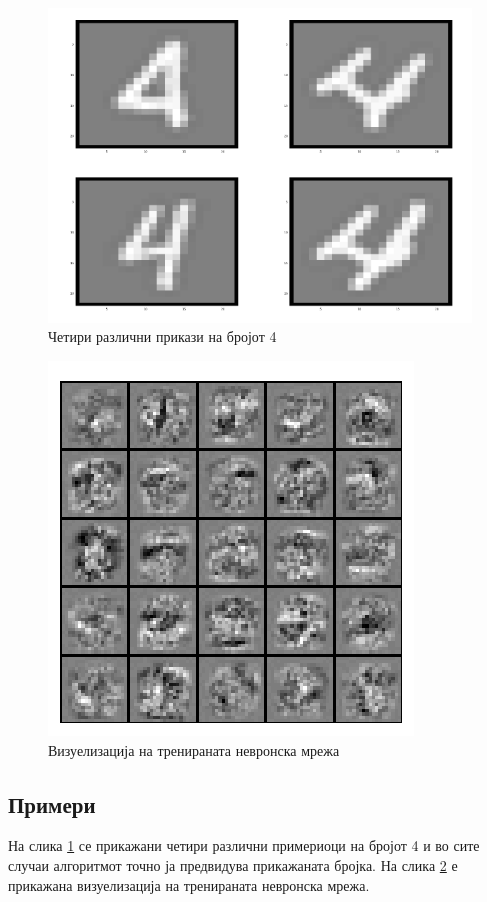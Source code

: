 \begin{figure}[htb]
\centering
\includegraphics[width=.6\textwidth]{src/neuralNetwork1/num_4}
\caption{Четири различни прикази на бројот 4}
\label{fig:num4}
\end{figure}

\begin{figure}[htb]
\centering
\includegraphics[width=.6\textwidth]{src/neuralNetwork2/nn_viz}
\caption{Визуелизација на тренираната невронска мрежа}
\label{fig:viz}
\end{figure}

\subsection{Примери}

На слика \ref{fig:num4} се прикажани четири различни примериоци на бројот 4 и во
сите случаи алгоритмот точно ја предвидува прикажаната бројка. На слика
\ref{fig:viz} е прикажана визуелизација на тренираната невронска мрежа.





